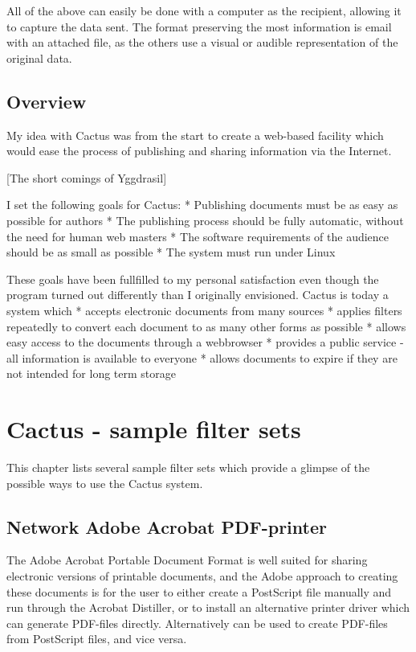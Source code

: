 All of the above can easily be done with a computer as the
recipient, allowing it to capture the data sent.  The format
preserving the most information is email with an attached
file, as the others use a visual or audible representation
of the original data.




\section{Overview}

My idea with Cactus was from the start to create a web-based
facility which would ease the process of publishing and
sharing information via the Internet.

[The short comings of Yggdrasil]

I set the following goals for Cactus: * Publishing documents
must be as easy as possible for authors * The publishing
process should be fully automatic, without the need for
human web masters * The software requirements of the
audience should be as small as possible * The system must
run under Linux

These goals have been fullfilled to my personal satisfaction
even though the program turned out differently than I
originally envisioned. Cactus is today a system which *
accepts electronic documents from many sources * applies
filters repeatedly to convert each document to as many other
forms as possible * allows easy access to the documents
through a webbrowser * provides a public service - all
information is available to everyone * allows documents to
expire if they are not intended for long term storage


\chapter{Cactus - sample filter sets}
\label{cha:cactus-sample-filter-sets}

This chapter lists several sample filter sets which provide a glimpse
of the possible ways to use the Cactus system. 

\section{Network Adobe Acrobat PDF-printer}
\label{sec:network-adobe-acrobat-pdf-printer}

The Adobe Acrobat Portable Document Format is well suited for sharing
electronic versions of printable documents, and the Adobe approach to
creating these documents is for the user to either create a PostScript
file manually and run through the Acrobat Distiller, or to install an
alternative printer driver which can generate PDF-files directly.
Alternatively  can be used to create PDF-files from PostScript files, and
vice versa.


